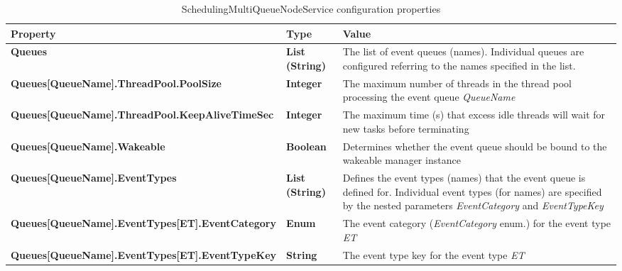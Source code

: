 \begin{table}
\scriptsize
\begin{center}
\begin{tabular}{p{6.3cm} p{0.9cm} p{7.3cm}}
	\hline
	\textbf{Property}											& \textbf{Type}						& \textbf{Value}					\\[1mm]
    \hline
	\textbf{Queues}												& \textbf{List (String)}			& The list of event queues (names). Individual queues are configured referring to the names specified in the list.		\\[1.5mm]	
	\textbf{Queues[QueueName].ThreadPool.PoolSize}				& \textbf{Integer}					& The maximum number of threads in the thread pool processing the event queue \emph{QueueName}		\\[1.5mm]	
	\textbf{Queues[QueueName].ThreadPool.KeepAliveTimeSec}		& \textbf{Integer}					& The maximum time (s) that excess idle threads will wait for new tasks before terminating			\\[1.5mm]	
	\textbf{Queues[QueueName].Wakeable}							& \textbf{Boolean}					& Determines whether the event queue should be bound to the wakeable manager instance					\\[1.5mm]	
	\textbf{Queues[QueueName].EventTypes}						& \textbf{List (String)}			& Defines the event types (names) that the event queue is defined for. Individual event types (for names) are specified by the nested parameters \emph{EventCategory} and \emph{EventTypeKey}			\\[1.5mm]	
	\textbf{Queues[QueueName].EventTypes[ET].EventCategory}		& \textbf{Enum}						& The event category (\emph{EventCategory} enum.) for the event type \emph{ET}						\\[1.5mm]	
	\textbf{Queues[QueueName].EventTypes[ET].EventTypeKey}		& \textbf{String}					& The event type key for the event type \emph{ET}						\\[1.5mm]	
    \hline
\end{tabular}
\end{center}
\caption{SchedulingMultiQueueNodeService configuration properties}
\label{tab:libSchedulingMultiQueueNodeService}
\end{table}



